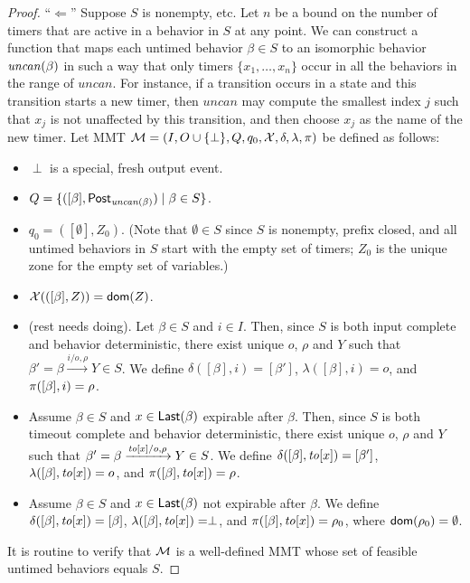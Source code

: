 \begin{proof}
``$\Leftarrow$'' Suppose $S$ is nonempty, etc.
Let $n$ be a bound on the number of timers that are active in a behavior in $S$ at any point.
We can construct a function that maps each untimed behavior $\beta \in S$
to an isomorphic behavior $\mathit{uncan}({\beta})$ in such a way that only timers $\{ x_1 ,\ldots, x_n \}$ occur 
in all the behaviors in the range of $\mathit{uncan}$.
For instance, if a transition occurs in a state and this transition
starts a new timer, then $\mathit{uncan}$ may compute the smallest index $j$
such that $x_j$ is not unaffected by this transition, and then choose $x_j$ as the name of the new timer.
Let MMT ${\mathcal M} = (I, O \cup \{ \perp \}, Q, q_0, \mathcal{X}, \delta, \lambda, \pi)$ be defined as follows:
\begin{itemize}
\item
$\perp$ is a special, fresh output event.
\item
$Q = \{ ( [\beta], \mathsf{Post}_{\mathit{uncan}({\beta})}) \mid \beta \in S \}$.
\item
$q_0 = ([\emptyset], Z_0)$. (Note that $\emptyset \in S$ since $S$ is nonempty, prefix closed, and all untimed behaviors in $S$ start
with the empty set of timers; $Z_0$ is the unique zone for the empty set of variables.)
\item
$\mathcal{X}(([\beta], Z)) = {\textsf{dom}}(Z)$.
\item
(rest needs doing). Let $\beta \in S$ and $i \in I$. Then, since $S$ is both input complete and behavior deterministic, there exist unique
$o$, $\rho$ and $Y$ such that $\beta' = \beta \xrightarrow{i/o, \rho} Y \in S$.
We define $\delta([\beta],i) = [\beta']$, $\lambda([\beta],i) = o$, and $\pi([\beta],i) = \rho$.
\item
Assume $\beta \in S$ and $x\in \mathsf{Last}({\beta})$ expirable after $\beta$. 
Then, since $S$ is both timeout complete and behavior deterministic, there exist unique
$o$, $\rho$ and $Y$ such that $\beta' = \beta \xrightarrow{\mathit{to}[x]/o, \rho} Y \in S$.
We define $\delta([\beta],\mathit{to}[x]) = [\beta']$, $\lambda([\beta],\mathit{to}[x]) = o$, and $\pi([\beta],\mathit{to}[x]) = \rho$.
\item
Assume $\beta \in S$ and $x \in \mathsf{Last}({\beta})$ not expirable after $\beta$.
We define $\delta([\beta],\mathit{to}[x]) = [\beta]$, $\lambda([\beta],\mathit{to}[x]) = \perp$, and $\pi([\beta],\mathit{to}[x]) = \rho_0$, where ${\textsf{dom}}(\rho_0) = \emptyset$.
\end{itemize}
It is routine to verify that ${\mathcal M}$ is a well-defined MMT whose set of feasible untimed behaviors equals $S$.
\end{proof}
\fi
